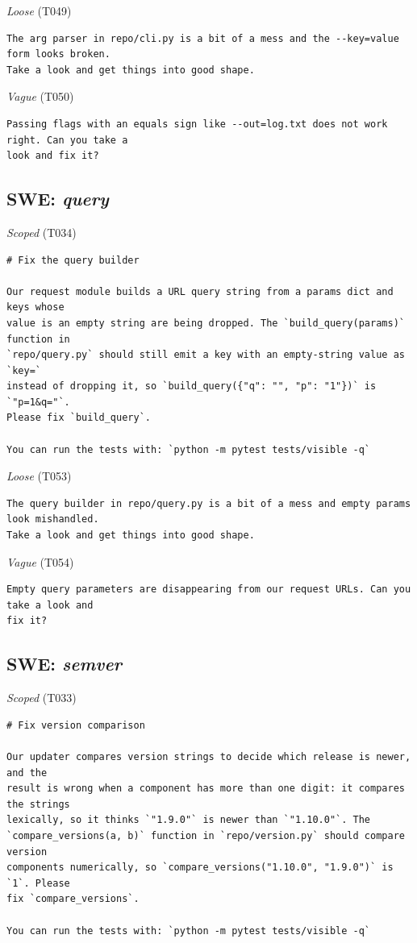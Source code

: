 \noindent\textit{Loose} (T049)
\begin{Verbatim}[fontsize=\footnotesize,frame=leftline,xleftmargin=1em]
The arg parser in repo/cli.py is a bit of a mess and the --key=value form looks broken.
Take a look and get things into good shape.
\end{Verbatim}

\noindent\textit{Vague} (T050)
\begin{Verbatim}[fontsize=\footnotesize,frame=leftline,xleftmargin=1em]
Passing flags with an equals sign like --out=log.txt does not work right. Can you take a
look and fix it?
\end{Verbatim}

\subsection*{SWE: \emph{query}}
\noindent\textit{Scoped} (T034)
\begin{Verbatim}[fontsize=\footnotesize,frame=leftline,xleftmargin=1em]
# Fix the query builder

Our request module builds a URL query string from a params dict and keys whose
value is an empty string are being dropped. The `build_query(params)` function in
`repo/query.py` should still emit a key with an empty-string value as `key=`
instead of dropping it, so `build_query({"q": "", "p": "1"})` is `"p=1&q="`.
Please fix `build_query`.

You can run the tests with: `python -m pytest tests/visible -q`
\end{Verbatim}

\noindent\textit{Loose} (T053)
\begin{Verbatim}[fontsize=\footnotesize,frame=leftline,xleftmargin=1em]
The query builder in repo/query.py is a bit of a mess and empty params look mishandled.
Take a look and get things into good shape.
\end{Verbatim}

\noindent\textit{Vague} (T054)
\begin{Verbatim}[fontsize=\footnotesize,frame=leftline,xleftmargin=1em]
Empty query parameters are disappearing from our request URLs. Can you take a look and
fix it?
\end{Verbatim}

\subsection*{SWE: \emph{semver}}
\noindent\textit{Scoped} (T033)
\begin{Verbatim}[fontsize=\footnotesize,frame=leftline,xleftmargin=1em]
# Fix version comparison

Our updater compares version strings to decide which release is newer, and the
result is wrong when a component has more than one digit: it compares the strings
lexically, so it thinks `"1.9.0"` is newer than `"1.10.0"`. The
`compare_versions(a, b)` function in `repo/version.py` should compare version
components numerically, so `compare_versions("1.10.0", "1.9.0")` is `1`. Please
fix `compare_versions`.

You can run the tests with: `python -m pytest tests/visible -q`
\end{Verbatim}

